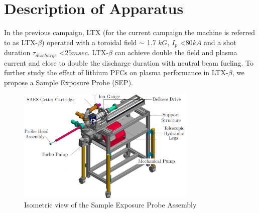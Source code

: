 \documentclass[aip,rsi,amsmath,amssymb,reprint]{revtex4-1}
\begin{document}
\section{Description of Apparatus}

In the previous campaign, LTX (for the current campaign the machine is referred to as LTX-$\beta$) operated with a toroidal field $\sim$ 1.7 $kG$, $I_p$ \textless $80 kA$ and a shot duration $\tau_{discharge}$ \textless $25 msec$. LTX-$\beta$ can achieve double the field and plasma current and close to double the discharge duration with neutral beam fueling. To further study the effect of lithium PFCs on plasma performance in LTX-$\beta$, we propose a Sample Exposure Probe (SEP).

\begin{figure}%
\centering
\includegraphics[width=3.37in,keepaspectratio]{SEP_Annotated}%
\caption{Isometric view of the Sample Exposure Probe Assembly}
\end{figure}
\end{document}
